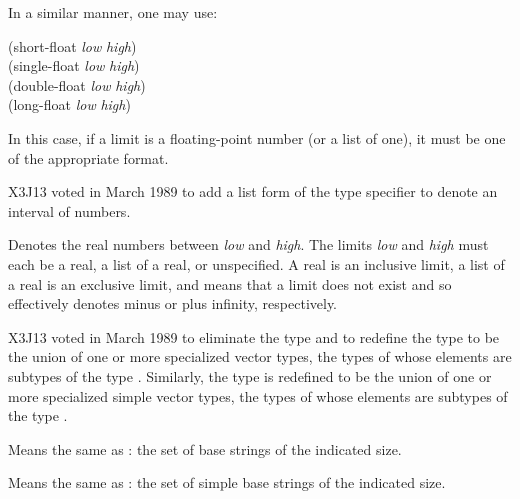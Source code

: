 \begin{flushdesc}
In a similar manner, one may use:
\begin{lisp}
(short-float \emph{low} \emph{high}) \\
(single-float \emph{low} \emph{high}) \\
(double-float \emph{low} \emph{high}) \\
(long-float \emph{low} \emph{high})
\end{lisp}
In this case, if a limit is a floating-point
number (or a list of one), it must be one of the appropriate format.
\end{flushdesc}

\begin{newer}
X3J13 voted in March 1989  to add a list form of the 
type specifier to denote an interval of  numbers.

\begin{flushdesc}
\item[\cd{(real \emph{low} \emph{high})}]
Denotes the real numbers between
\emph{low} and \emph{high}.  The limits \emph{low} and \emph{high}
must each be a real, a list of a real, or unspecified.
A real is an inclusive limit,
a list of a real is an exclusive limit, and
\cdf{*} means that a limit does not exist
and so effectively denotes minus or plus infinity, respectively.
\end{flushdesc}
\end{newer}

\begin{newer}
X3J13 voted in March 1989 
to eliminate the type  and to redefine the type
 to be the union of one or more specialized vector
types, the types of whose elements are subtypes of the type .
Similarly, the type
 is redefined to be the union of one or more specialized
simple vector
types, the types of whose elements are subtypes of the type .

\begin{flushdesc}
\item[\cd{(base-string \emph{size})}]
Means the same as
: the set of base
strings of the indicated size.


\item[\cd{(simple-base-string \emph{size})}]
Means the same
as : the set of simple base
strings of the indicated size.
\end{flushdesc}
\end{newer}

